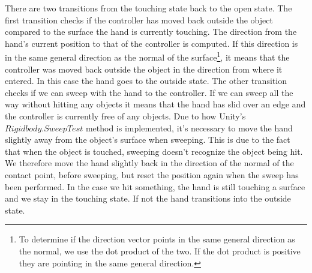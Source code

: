 There are two transitions from the touching state back to the open state. The first transition checks if the controller has moved back outside the object compared to the surface the hand is currently touching. The direction from the hand's current position to that of the controller is computed. If this direction is in the same general direction as the normal of the surface\footnote{To determine if the direction vector points in the same general direction as the normal, we use the dot product of the two. If the dot product is positive they are pointing in the same general direction.}, it means that the controller was moved back outside the object in the direction from where it entered. In this case the hand goes to the outside state. The other transition checks if we can sweep with the hand to the controller. If we can sweep all the way without hitting any objects it means that the hand has slid over an edge and the controller is currently free of any objects. Due to how Unity's $Rigidbody.SweepTest$ method is implemented, it's necessary to move the hand slightly away from the object's surface when sweeping. This is due to the fact that when the object is touched, sweeping doesn't recognize the object being hit. We therefore move the hand slightly back in the direction of the normal of the contact point, before sweeping, but reset the position again when the sweep has been performed. In the case we hit something, the hand is still touching a surface and we stay in the touching state. If not the hand transitions into the outside state.


